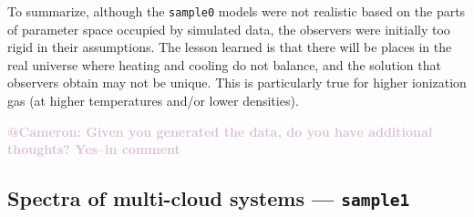 \documentclass[fleqn,usenatbib]{mnras}
\makeatletter
\newcommand{\atcameron}[1]{\textcolor{Thistle}{\textbf{@Cameron: #1}}}
\makeatother
\begin{document}
To summarize,
although the \texttt{sample0} models were not realistic based on the parts of parameter space occupied by simulated data, the observers were initially too rigid in their assumptions.
The lesson learned is that there will be places in the real universe where heating and cooling do not balance, and the solution that observers obtain may not be unique.
This is particularly true for higher ionization gas (at higher temperatures and/or lower densities).

\atcameron{Given you generated the data, do you have additional thoughts? Yes--in comment}

\subsection{Spectra of multi-cloud systems --- \texttt{sample1}}
\label{s: results -- sample1}
\end{document}
